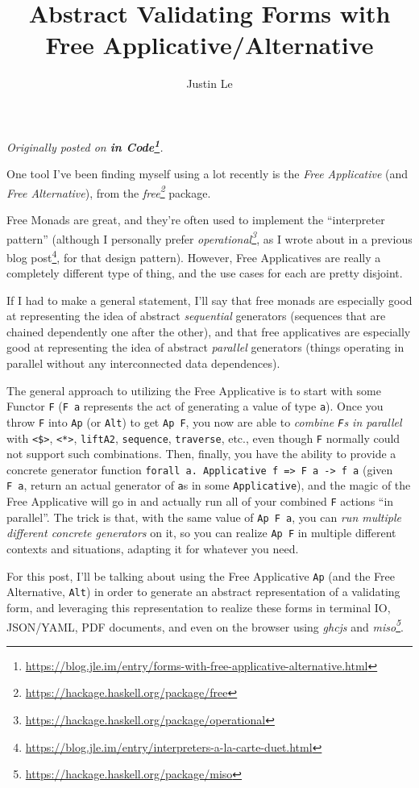 \documentclass[]{article}
\title{Abstract Validating Forms with Free Applicative/Alternative}
\author{Justin Le}
\renewcommand{\href}[2]{#2\footnote{\url{#1}}}
\begin{document}
\maketitle

\emph{Originally posted on
\textbf{\href{https://blog.jle.im/entry/forms-with-free-applicative-alternative.html}{in
Code}}.}

One tool I've been finding myself using a lot recently is the \emph{Free
Applicative} (and \emph{Free Alternative}), from the
\emph{\href{https://hackage.haskell.org/package/free}{free}} package.

Free Monads are great, and they're often used to implement the ``interpreter
pattern'' (although I personally prefer
\emph{\href{https://hackage.haskell.org/package/operational}{operational}}, as I
wrote about in a
\href{https://blog.jle.im/entry/interpreters-a-la-carte-duet.html}{previous blog
post}, for that design pattern). However, Free Applicatives are really a
completely different type of thing, and the use cases for each are pretty
disjoint.

If I had to make a general statement, I'll say that free monads are especially
good at representing the idea of abstract \emph{sequential} generators
(sequences that are chained dependently one after the other), and that free
applicatives are especially good at representing the idea of abstract
\emph{parallel} generators (things operating in parallel without any
interconnected data dependences).

The general approach to utilizing the Free Applicative is to start with some
Functor \texttt{F} (\texttt{F\ a} represents the act of generating a value of
type \texttt{a}). Once you throw \texttt{F} into \texttt{Ap} (or \texttt{Alt})
to get \texttt{Ap\ F}, you now are able to \emph{combine \texttt{F}s in
parallel} with \texttt{\textless{}\$\textgreater{}},
\texttt{\textless{}*\textgreater{}}, \texttt{liftA2}, \texttt{sequence},
\texttt{traverse}, etc., even though \texttt{F} normally could not support such
combinations. Then, finally, you have the ability to provide a concrete
generator function
\texttt{forall\ a.\ Applicative\ f\ =\textgreater{}\ F\ a\ -\textgreater{}\ f\ a}
(given \texttt{F\ a}, return an actual generator of \texttt{a}s in some
\texttt{Applicative}), and the magic of the Free Applicative will go in and
actually run all of your combined \texttt{F} actions ``in parallel''. The trick
is that, with the same value of \texttt{Ap\ F\ a}, you can \emph{run multiple
different concrete generators} on it, so you can realize \texttt{Ap\ F} in
multiple different contexts and situations, adapting it for whatever you need.

For this post, I'll be talking about using the Free Applicative \texttt{Ap} (and
the Free Alternative, \texttt{Alt}) in order to generate an abstract
representation of a validating form, and leveraging this representation to
realize these forms in terminal IO, JSON/YAML, PDF documents, and even on the
browser using \emph{ghcjs} and
\emph{\href{https://hackage.haskell.org/package/miso}{miso}}.
\end{document}
